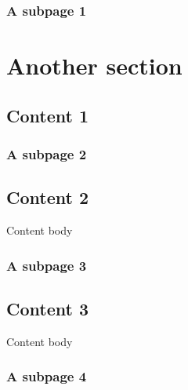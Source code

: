 \section{A subpage 1}
\label{\detokenize{subfolder/asubpage1:a-subpage-1}}\label{\detokenize{subfolder/asubpage1::doc}}

\part{Another section}


\chapter{Content 1}
\label{\detokenize{content1:content-1}}\label{\detokenize{content1::doc}}

\section{A subpage 2}
\label{\detokenize{subfolder/asubpage2:a-subpage-2}}\label{\detokenize{subfolder/asubpage2::doc}}

\chapter{Content 2}
\label{\detokenize{content2:content-2}}\label{\detokenize{content2::doc}}
\sphinxAtStartPar
Content body


\section{A subpage 3}
\label{\detokenize{subfolder/asubpage3:a-subpage-3}}\label{\detokenize{subfolder/asubpage3::doc}}

\chapter{Content 3}
\label{\detokenize{content3:content-3}}\label{\detokenize{content3::doc}}
\sphinxAtStartPar
Content body


\section{A subpage 4}
\label{\detokenize{subfolder/asubpage4:a-subpage-4}}\label{\detokenize{subfolder/asubpage4::doc}}






\renewcommand{\indexname}{Index}
\printindex
